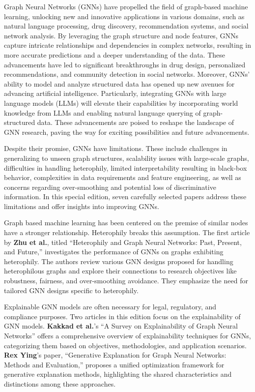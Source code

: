 \documentclass[11pt]{article}
\begin{document}
Graph Neural Networks (GNNs) have propelled the field of graph-based machine learning, unlocking new and innovative applications in various domains, such as natural language processing, drug discovery, recommendation systems, and social network analysis. By leveraging the graph structure and node features, GNNs capture intricate relationships and dependencies in complex networks, resulting in more accurate predictions and a deeper understanding of the data. These advancements have led to significant breakthroughs in drug design, personalized recommendations, and community detection in social networks. Moreover, GNNs’ ability to model and analyze structured data has opened up new avenues for advancing artificial intelligence. Particularly, integrating GNNs with large language models (LLMs) will elevate their capabilities by incorporating world knowledge from LLMs and enabling natural language querying of graph-structured data. These advancements are poised to reshape the landscape of GNN research, paving the way for exciting possibilities and future advancements.

Despite their promise, GNNs have limitations. These include challenges in generalizing to unseen graph structures, scalability issues with large-scale graphs, difficulties in handling heterophily, limited interpretability resulting in black-box behavior, complexities in data requirements and feature engineering, as well as concerns regarding over-smoothing and potential loss of discriminative information. In this special edition, seven carefully selected papers address these limitations and offer insights into improving GNNs.

Graph based machine learning has been centered on the premise of similar nodes have a stronger relationship. Heterophily breaks this assumption. The first article by {\bf Zhu et al.}, titled “Heterophily and Graph Neural Networks: Past, Present, and Future,” investigates the performance of GNNs on graphs exhibiting heterophily. The authors review various GNN designs proposed for handling heterophilous graphs and explore their connections to research objectives like robustness, fairness, and over-smoothing avoidance. They emphasize the need for tailored GNN designs specific to heterophily.

Explainable GNN models are often necessary for legal, regulatory, and compliance purposes. Two articles in this edition focus on the explainability of GNN models. {\bf Kakkad et al.}’s “A Survey on Explainability of Graph Neural Networks” offers a comprehensive overview of explainability techniques for GNNs, categorizing them based on objectives, methodologies, and application scenarios. {\bf Rex Ying}’s paper, “Generative Explanation for Graph Neural Networks: Methods and Evaluation,” proposes a unified optimization framework for generative explanation methods, highlighting the shared characteristics and distinctions among these approaches.
\end{document}
